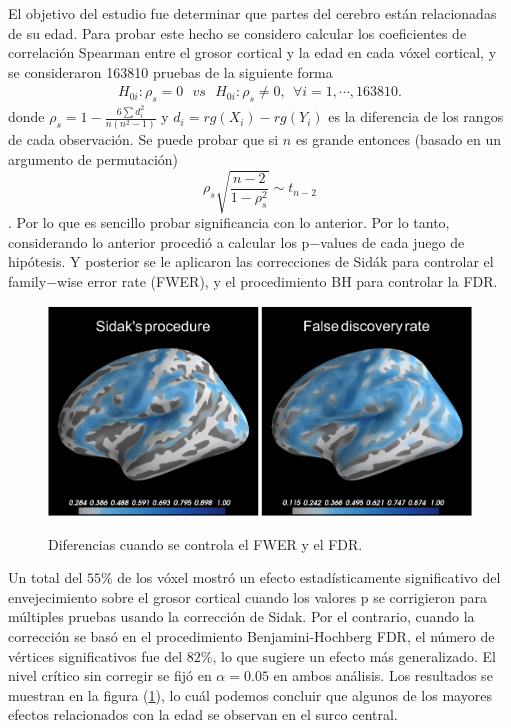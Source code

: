 \documentclass[11pt,letterpaper]{article}
\begin{document}
El objetivo del estudio fue determinar que partes del cerebro están relacionadas de su edad. Para probar este hecho se considero calcular los coeficientes de correlación Spearman  entre el grosor cortical y la edad en cada vóxel cortical, y se consideraron 163810 pruebas de la siguiente forma
\begin{align*}
H_{0i}: \rho_s =0 \ \ \ vs \ \ \ H_{0i}:\rho_s\neq 0, \ \ \forall i=1,\cdots, 163810.
\end{align*}
donde $\rho_s=1-\frac{6\sum d_i^2}{n(n^2-1)}$ y $d_i=rg(X_i)-rg(Y_i)$ es la diferencia de los rangos de cada observación. Se puede probar que si $n$ es grande entonces (basado en un argumento de permutación) 
$$\rho_s\sqrt{\frac{n-2}{1-\rho_s^2}} \sim t_{n-2}$$.
Por lo que es sencillo probar significancia con lo anterior. Por lo tanto, considerando lo anterior procedió a calcular los p$-$values de cada juego de hipótesis. Y posterior se le aplicaron las correcciones de Sidák para controlar el family$-$wise error rate (FWER), y el procedimiento BH para controlar la FDR. 
\begin{figure}[H]
\centering \label{cerebro}
\includegraphics[scale=.5]{neurociencia_FDR_FWER.png}
\caption{Diferencias cuando se controla el FWER y el FDR.}
\end{figure}
Un total del $55\%$ de los vóxel mostró un efecto estadísticamente significativo del envejecimiento sobre el grosor cortical cuando los valores p se corrigieron para múltiples pruebas usando la corrección de Sidak. Por el contrario, cuando la corrección se basó en el procedimiento Benjamini-Hochberg FDR, el número de vértices significativos fue del $82\%$, lo que sugiere un efecto más generalizado. El nivel crítico sin corregir se fijó en $\alpha = 0.05$ en ambos análisis.
Los resultados se muestran en la figura (\ref{cerebro}), lo cuál podemos concluir que algunos de los mayores efectos relacionados con la edad se observan en el surco central.
\end{document}
